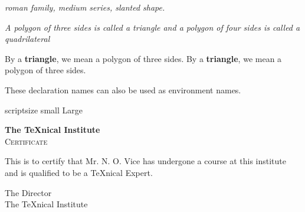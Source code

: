 \documentclass{article}
\begin{document}
\textrm{\textsl{roman family, medium series, slanted shape.}}

\textit{A polygon of three sides is called a \emph{triangle} and a
polygon of four sides is called a \emph{quadrilateral}}

By a \textbf{triangle}, we mean a polygon of three sides.
By a {\bfseries triangle}, we mean a polygon of three sides.

\begin{sffamily}
These declaration names can also be used as environment names.
\end{sffamily}

{\scriptsize scriptsize} {\small small} {\Large Large}

\pagebreak

\begin{center}
{\bfseries\huge The \TeX nical Institute}\\[1cm]
{\scshape\LARGE Certificate}
\end{center}
\noindent This is to certify that Mr. N. O. Vice has undergone a
course at this institute and is qualified to be a \TeX nical Expert.
\begin{flushright}
{\sffamily The Director\\
The \TeX nical Institute}
\end{flushright}
\end{document}

